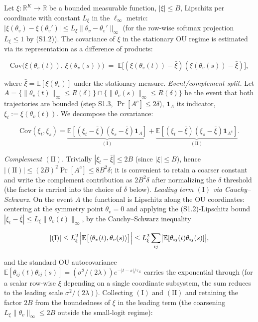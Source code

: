 \documentclass[pdflatex,sn-mathphys-ay]{sn-jnl}
\begin{document}
Let \(\xi: \mathbb{R}^K \to \mathbb{R}\) be a bounded measurable function, \(|\xi| \le B\), Lipschitz per coordinate with constant \(L_\xi\) in the \(\ell_\infty\) metric: \(|\xi(\theta_v) - \xi(\theta_v')| \le L_\xi \|\theta_v - \theta_v'\|_\infty\) (for the row-wise softmax projection \(L_\xi \le 1\) by (S1.2)). The covariance of \(\xi\) in the stationary OU regime is estimated via its representation as a difference of products:



\[\text{Cov}\bigl(\xi(\theta_v(t)),\, \xi(\theta_v(s))\bigr) \;=\; \mathbb{E}\bigl[(\xi(\theta_v(t)) - \bar\xi)(\xi(\theta_v(s)) - \bar\xi)\bigr],\]



where \(\bar\xi = \mathbb{E}[\xi(\theta_v)]\) under the stationary measure. \emph{Event/complement split.} Let \(A = \{\|\theta_v(t)\|_\infty \le R(\delta)\} \cap \{\|\theta_v(s)\|_\infty \le R(\delta)\}\) be the event that both trajectories are bounded (step S1.3, \(\Pr[A^c] \le 2\delta\)), \(\mathbf{1}_A\) its indicator, \(\xi_t := \xi(\theta_v(t))\). We decompose the covariance:



\[\text{Cov}(\xi_t, \xi_s) = \underbrace{\mathbb{E}[(\xi_t-\bar\xi)(\xi_s-\bar\xi)\mathbf{1}_A]}_{(\mathrm{I})} + \underbrace{\mathbb{E}[(\xi_t-\bar\xi)(\xi_s-\bar\xi)\mathbf{1}_{A^c}]}_{(\mathrm{II})}.\]



\emph{Complement \((\mathrm{II})\).} Trivially \(|\xi_t-\bar\xi| \le 2B\) (since \(|\xi| \le B\)), hence \(|(\mathrm{II})| \le (2B)^2 \Pr[A^c] \le 8B^2\delta\); it is convenient to retain a coarser constant and write the complement contribution as \(2B^2\delta\) after normalizing the \(\delta\) threshold (the factor is carried into the choice of \(\delta\) below). \emph{Leading term \((\mathrm{I})\) via Cauchy--Schwarz.} On the event \(A\) the functional is Lipschitz along the OU coordinates: centering at the symmetry point \(\theta_v = 0\) and applying the (S1.2)-Lipschitz bound \(|\xi_t-\bar\xi| \le L_\xi\|\theta_v(t)\|_\infty\), by the Cauchy--Schwarz inequality



\[|(\mathrm{I})| \le L_\xi^2\,\Bigl|\mathbb{E}\bigl[\langle\theta_v(t),\theta_v(s)\rangle\bigr]\Bigr| \le L_\xi^2 \sum_{ij}\bigl|\mathbb{E}[\theta_{ij}(t)\theta_{ij}(s)]\bigr|,\]



and the standard OU autocovariance \(\mathbb{E}[\theta_{ij}(t)\theta_{ij}(s)] = (\sigma^2/(2\lambda)) e^{-|t-s|/\tau_E}\) carries the exponential through (for a scalar row-wise \(\xi\) depending on a single coordinate subsystem, the sum reduces to the leading scale \(\sigma^2/(2\lambda)\)). Collecting \((\mathrm{I})\) and \((\mathrm{II})\) and retaining the factor \(2B\) from the boundedness of \(\xi\) in the leading term (the coarsening \(L_\xi\|\theta_v\|_\infty \le 2B\) outside the small-logit regime):
\end{document}
